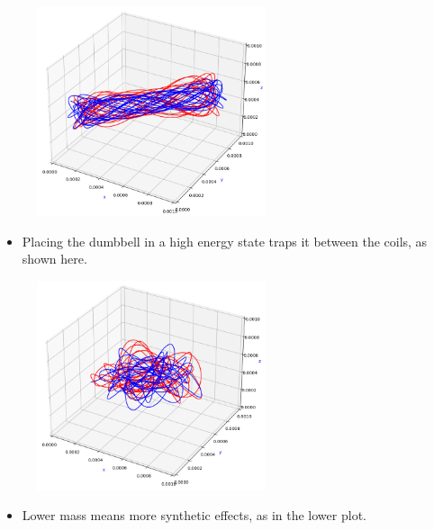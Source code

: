 \documentclass[20pt]{beamer}
\begin{document}
\begin{frame}{}
\begin{textblock}{7.25}
   \begin{figure}[h]
           \centering
           \includegraphics[width=0.6\textwidth]{(0,2)-comp1}
           \label{fig:comp2}
   \end{figure}
   \begin{itemize}[label=\textbullet, leftmargin=25mm]
           \item Placing the dumbbell in a high energy state traps it between the coils, as
               shown here.
   \end{itemize}
   \begin{figure}[h]
           \centering
           \includegraphics[width=0.6\textwidth]{(1,1)-comp1}
           \label{fig:comp1}
   \end{figure}
   \begin{itemize}[label=\textbullet, leftmargin=25mm]
           \item Lower mass means more synthetic effects, as in the lower plot.
   \end{itemize}

  \end{textblock}



 \end{frame} 
\end{document}
